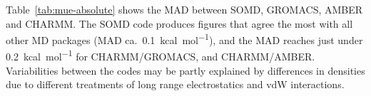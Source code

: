 \documentclass[journal=jctcce,manuscript=article]{achemso}
\begin{document}

Table~\ref{tab:mue-absolute} shows the MAD between SOMD, GROMACS, AMBER and
CHARMM.  The SOMD code produces figures that agree the most with all other MD packages (MAD ca.\ \SI{0.1}{kcal.mol^{-1}}), and the MAD reaches just under
\SI{0.2}{kcal.mol^{-1}} for CHARMM/GROMACS, and CHARMM/AMBER.  Variabilities between the codes may be partly explained by differences in densities due to different treatments of long range electrostatics and vdW interactions.
\end{document}
